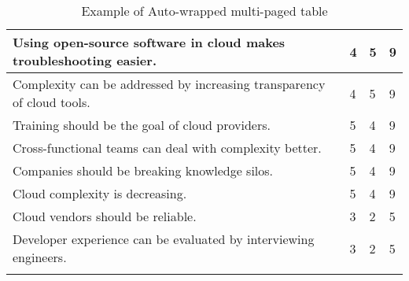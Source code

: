 \begin{longtable}{|p{10cm}|p{2cm}|p{2cm}|}
Using open-source software in cloud makes troubleshooting easier. & 4 & 5 & 9 \\ \hline
Complexity can be addressed by increasing transparency of cloud tools. & 4 & 5 & 9 \\ \hline
Training should be the goal of cloud providers. & 5 & 4 & 9 \\ \hline
Cross-functional teams can deal with complexity better. & 5 & 4 & 9 \\ \hline
Companies should be breaking knowledge silos. & 5 & 4 & 9 \\ \hline
Cloud complexity is decreasing. & 5 & 4 & 9 \\ \hline
Cloud vendors should be reliable. & 3 & 2 & 5 \\ \hline
Developer experience can be evaluated by interviewing engineers. & 3 & 2 & 5 \\ \hline
\caption{Example of Auto-wrapped multi-paged table}
\label{tab:table1}
\end{longtable}
